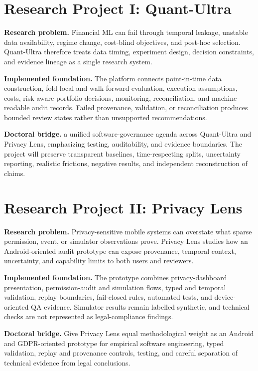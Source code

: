 \documentclass[11pt]{article}
\begin{document}
\section*{Research Project I: Quant-Ultra}
\textbf{Research problem.} Financial ML can fail through temporal leakage, unstable data availability, regime change, cost-blind objectives, and post-hoc selection. Quant-Ultra therefore treats data timing, experiment design, decision constraints, and evidence lineage as a single research system.

\textbf{Implemented foundation.} The platform connects point-in-time data construction, fold-local and walk-forward evaluation, execution assumptions, costs, risk-aware portfolio decisions, monitoring, reconciliation, and machine-readable audit records. Failed provenance, validation, or reconciliation produces bounded review states rather than unsupported recommendations.

\textbf{Doctoral bridge.} a unified software-governance agenda across Quant-Ultra and Privacy Lens, emphasizing testing, auditability, and evidence boundaries. The project will preserve transparent baselines, time-respecting splits, uncertainty reporting, realistic frictions, negative results, and independent reconstruction of claims.

\section*{Research Project II: Privacy Lens}
\textbf{Research problem.} Privacy-sensitive mobile systems can overstate what sparse permission, event, or simulator observations prove. Privacy Lens studies how an Android-oriented audit prototype can expose provenance, temporal context, uncertainty, and capability limits to both users and reviewers.

\textbf{Implemented foundation.} The prototype combines privacy-dashboard presentation, permission-audit and simulation flows, typed and temporal validation, replay boundaries, fail-closed rules, automated tests, and device-oriented QA evidence. Simulator results remain labelled synthetic, and technical checks are not represented as legal-compliance findings.

\textbf{Doctoral bridge.} Give Privacy Lens equal methodological weight as an Android and GDPR-oriented prototype for empirical software engineering, typed validation, replay and provenance controls, testing, and careful separation of technical evidence from legal conclusions.
\end{document}
